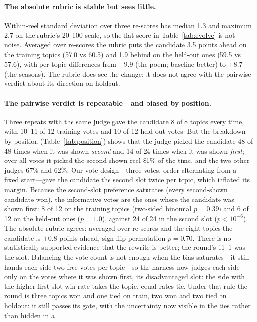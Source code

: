 \documentclass[11pt]{article}
\begin{document}
\paragraph{The absolute rubric is stable but sees little.} Within-reel standard deviation over three
re-scores has median 1.3 and maximum 2.7 on the rubric's 20--100 scale, so the flat score in
Table~\ref{tab:evolve} is not noise. Averaged over re-scores the rubric puts the candidate 3.5 points
ahead on the training topics (57.0 vs 60.5) and 1.9 behind on the held-out ones (59.5 vs 57.6), with
per-topic differences from $-9.9$ (the poem; baseline better) to $+8.7$ (the seasons). The rubric does
see the change; it does not agree with the pairwise verdict about its direction on holdout.

\paragraph{The pairwise verdict is repeatable---and biased by position.} Three repeats with the same
judge gave the candidate 8 of 8 topics every time, with 10--11 of 12 training votes and 10 of 12
held-out votes. But the breakdown by position (Table~\ref{tab:position}) shows that the judge picked
the candidate 48 of 48 times when it was shown \emph{second} and 14 of 24 times when it was shown
\emph{first}; over all votes it picked the second-shown reel 81\% of the time, and the two other judges
67\% and 62\%. Our vote design---three votes, order alternating from a fixed start---gave the candidate the second
slot twice per topic, which inflated its margin. Because the second-slot preference saturates (every
second-shown candidate won), the informative votes are the ones where the candidate was shown first:
8 of 12 on the training topics (two-sided binomial $p=0.39$) and 6 of 12 on the held-out ones
($p=1.0$), against 24 of 24 in the second slot ($p<10^{-6}$). The absolute rubric agrees: averaged
over re-scores and the eight topics the candidate is $+0.8$ points ahead, sign-flip permutation
$p=0.70$. There is no statistically supported evidence that the rewrite is better; the round's 11--1
was the slot. Balancing the vote count is not enough when the bias saturates---it still hands each side
two free votes per topic---so the harness now judges each side only on the votes where it was shown
first, its disadvantaged slot: the side with the higher first-slot win rate takes the topic, equal rates
tie. Under that rule the round is three topics won and one tied on train, two won and two tied on
holdout: it still passes its gate, with the uncertainty now visible in the ties rather than hidden in a
\end{document}
